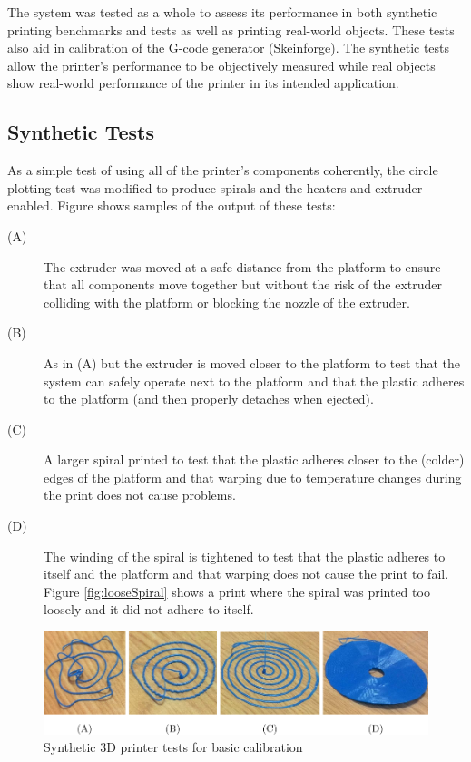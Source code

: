 		The system was tested as a whole to assess its performance in both synthetic
		printing benchmarks and tests as well as printing real-world objects. These
		tests also aid in calibration of the G-code generator (Skeinforge). The
		synthetic tests allow the printer's performance to be objectively measured
		while real objects show real-world performance of the printer in its
		intended application.
		
		\subsection{Synthetic Tests}
			
			As a simple test of using all of the printer's components coherently, the
			circle plotting test was modified to produce spirals and the heaters and
			extruder enabled. Figure \label{fig:syntheticTests} shows samples of the
			output of these tests:
			\begin{description}
				
				\item[(A)] The extruder was moved at a safe distance from the platform
				to ensure that all components move together but without the risk of the
				extruder colliding with the platform or blocking the nozzle of the
				extruder.
				
				\item[(B)] As in (A) but the extruder is moved closer to the platform to
				test that the system can safely operate next to the platform and that
				the plastic adheres to the platform (and then properly detaches when
				ejected).
				
				\item[(C)] A larger spiral printed to test that the plastic adheres
				closer to the (colder) edges of the platform and that warping due to
				temperature changes during the print does not cause problems.
				
				\item[(D)] The winding of the spiral is tightened to test that the
				plastic adheres to itself and the platform and that warping does not
				cause the print to fail. Figure \ref{fig:looseSpiral} shows a print
				where the spiral was printed too loosely and it did not adhere to
				itself.
				
			\end{description}
			
			\begin{figure}
				\includegraphics[width=1\textwidth]{diagrams/syntheticTests.pdf}
				\caption{Synthetic 3D printer tests for basic calibration}
				\label{fig:syntheticTests}
			\end{figure}
			
